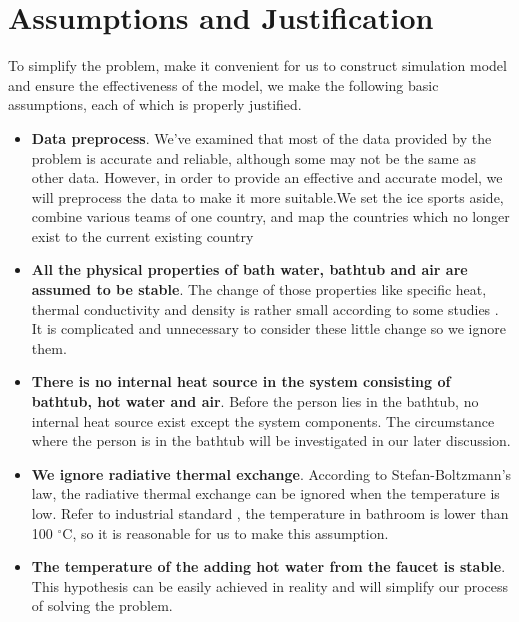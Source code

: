 
\section{Assumptions and Justification}

To simplify the problem, make it convenient for us to construct simulation model and ensure the effectiveness of the model, we make the following basic assumptions, each of which is properly justified.

\begin{itemize}
\item {\bf Data preprocess}. We've examined that most of the data provided by the problem is accurate and reliable, although some may not be the same as other data. However, in order to provide an effective and accurate model, we will preprocess the data to make it more suitable.We set the ice sports aside, combine various teams of one country, and map the countries which no longer exist to the current existing country 

\item {\bf All the physical properties of bath water, bathtub and air are assumed to be stable}. The change of those properties like specific heat, thermal conductivity and density is rather small according to some studies \cite{5}. It is complicated and unnecessary to consider these little change so we ignore them.

\item {\bf There is no internal heat source in the system consisting of bathtub, hot water and air}. Before the person lies in the bathtub, no internal heat source exist except the system components. The circumstance where the person is in the bathtub will be investigated in our later discussion.

\item {\bf We ignore radiative thermal exchange}. According to Stefan-Boltzmann’s law, the radiative thermal exchange can be ignored when the temperature is low. Refer to industrial standard \cite{6}, the temperature in bathroom is lower than 100 $^{\circ}$C, so it is reasonable for us to make this assumption.

\item {\bf The temperature of the adding hot water from the faucet is stable}. This hypothesis can be easily achieved in reality and will simplify our process of solving the problem.
\end{itemize}
